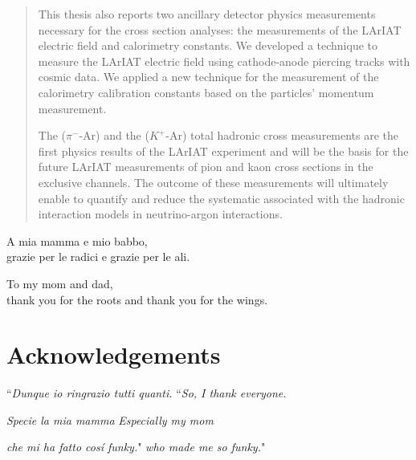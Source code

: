 \documentclass[letterpaper,12pt]{yalephd}
\newenvironment{dedication}
  {%
   \thispagestyle{empty}%
   \vspace*{\stretch{1}}%
   \itshape             %
   \raggedleft          %
  }
  {\par %
   \vspace{\stretch{3}} %
   \clearpage           %
  }
\begin{document}
\begin{abstract}
This thesis also reports two  ancillary  detector physics measurements necessary for the cross section analyses: the measurements of the LArIAT electric field and calorimetry constants. We developed a technique to measure the LArIAT electric field using cathode-anode piercing tracks with cosmic data. We applied a new technique for the measurement of the calorimetry calibration constants based on the particles' momentum measurement.


The ($\pi^-$-Ar) and the ($K^+$-Ar) total hadronic cross measurements are the first physics results of the LArIAT experiment and will be the basis for the future LArIAT measurements of pion and kaon cross sections in the exclusive channels.
The outcome of these measurements will ultimately enable to quantify and reduce the systematic associated with the hadronic interaction models in neutrino-argon interactions.

\end{abstract}


\maketitle
{}

 \begin{dedication}
A mia mamma e mio babbo,\\
grazie per le radici e grazie per le ali.
    \par   %
    \vspace{2\baselineskip}
To my mom and dad,\\
thank you for the roots and thank you for the wings.
    \vspace{\baselineskip}
  \end{dedication}

\tableofcontents
\listoffigures %
\listoftables %

\chapter{Acknowledgements} %

\noindent ``\emph{Dunque io ringrazio tutti quanti.} \hfill ``\emph{So, I thank everyone.} 

\noindent \emph{Specie la mia mamma} \hfill \emph{Especially my mom} 

\noindent \emph{che mi ha fatto cos\'i funky.}" \hfill \emph{who made me so funky.}"
\end{document}
